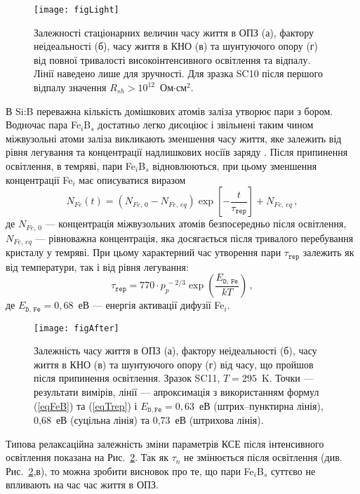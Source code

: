 \begin{figure}
\center
\texttt{[image: figLight]}
\caption{\label{figLight}
Залежності стаціонарних величин часу життя в ОПЗ (а),  фактору неідеальності (б), часу життя в КНО (в) та шунтуючого опору (г) від
повної тривалості високоінтенсивного освітлення та відпалу.
Лінії наведено лише для зручності.
Для зразка SC10 після першого відпалу значення $R_{sh}>10^{12}$~Ом$\cdot$см$^2$.
}%
\end{figure}


В Si:B переважна кількість домішкових атомів заліза утворює пари з бором.
Водночас пара Fe$_i$B$_s$ достатньо легко дисоціює і звільнені таким чином міжвузольні атоми заліза
викликають зменшення часу життя, яке залежить від рівня легування та концентрації надлишкових носіїв заряду \cite{FeB:Schmidt}.
Після припинення освітлення, в темряві, пари Fe$_i$B$_s$ відновлюються, при цьому
зменшення концентрації Fe$_i$ має описуватися виразом \cite{MurphyJAP2011,Wijaranakula}
\begin{equation}
\label{eqFeB}
N_{Fe}(t)=(N_{Fe,\,0}-N_{Fe,\,eq})\exp\left[-\frac{t}{\tau_{\mathtt{rep}}}\right]+N_{Fe,\,eq}\,,
\end{equation}
де
$N_{Fe,\,0}$ --- концентрація міжвузольних атомів безпосередньо після освітлення,
$N_{Fe,\,eq}$ --- рівноважна концентрація, яка досягається після тривалого перебування кристалу у темряві.
При цьому характерний час утворення пари $\tau_{\mathtt{rep}}$ залежить як від температури, так і від
рівня легування:
\begin{equation}
\label{eqTrep}
\tau_{\mathtt{rep}}=770\cdot p_p^{\,-2/3}\exp\left(\frac{E_{\mathtt{D,\,Fe}}}{kT}\right)\,,
\end{equation}
де
$E_{\mathtt{D,\,Fe}}=0,68$~еВ --- енергія активації дифузії Fe$_i$.


\begin{figure}
\center
\texttt{[image: figAfter]}
\caption{\label{figAfter}
Залежність часу життя в ОПЗ (а),  фактору неідеальності (б), часу життя в КНО (в) та шунтуючого опору (г) від часу, що пройшов
після припинення освітлення.
Зразок SC11, $T=295$~K.
Точки --- результати вимірів,
лінії --- апроксимація з використанням формул (\ref{eqFeB}) та (\ref{eqTrep})
і $E_{\mathtt{D,Fe}}=0,63$~еВ (штрих--пунктирна лінія), 0,68~еВ (суцільна лінія) та 0,73~еВ (штрихова лінія).
}%
\end{figure}

Типова релаксаційна залежність зміни параметрів КСЕ після інтенсивного освітлення показана на Рис.~\ref{figAfter}.
Так як $\tau_n$ не змінюється після освітлення (див. Рис.~\ref{figAfter},в), то можна зробити висновок про те, що
пари Fe$_i$B$_s$ суттєво не впливають на час час життя в ОПЗ.

